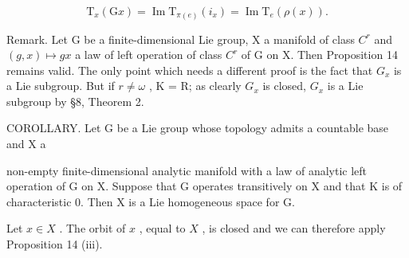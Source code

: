 \[
\mathrm{T} _ {x} (\mathrm{G} x) = \operatorname{Im} \mathrm{T} _ {\pi (e)} (i _ {x}) = \operatorname{Im} \mathrm{T} _ {e} (\rho (x)).
\]

Remark. Let G be a finite-dimensional Lie group, X a manifold of class \(C^{r}\) and \((g, x) \mapsto gx\) a law of left operation of class \(C^{r}\) of G on X. Then Proposition 14 remains valid. The only point which needs a different proof is the fact that \(G_{x}\) is a Lie subgroup. But if \(r \neq \omega\) , K = R; as clearly \(G_{x}\) is closed, \(G_{x}\) is a Lie subgroup by §8, Theorem 2.

COROLLARY. Let G be a Lie group whose topology admits a countable base and X a

non-empty finite-dimensional analytic manifold with a law of analytic left operation of G on X. Suppose that G operates transitively on X and that K is of characteristic 0. Then X is a Lie homogeneous space for G.

Let \(x \in X\) . The orbit of \(x\) , equal to \(X\) , is closed and we can therefore apply Proposition 14 (iii).

